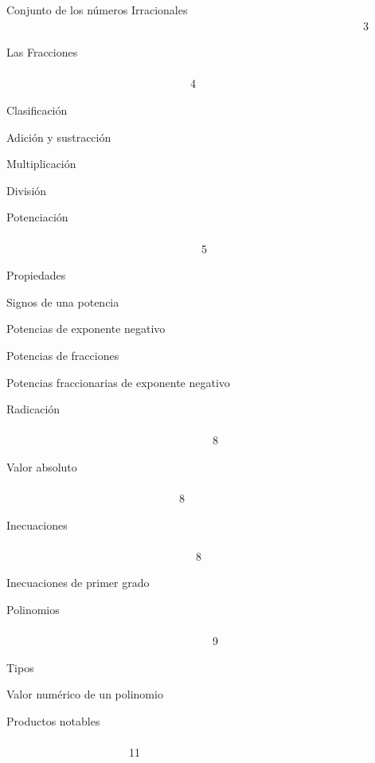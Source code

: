\documentclass{article}
\begin{document}
Conjunto de los n\'umeros Irracionales \ \ \ \ \ \ \ \ \ \ \ \ \ \ \ \ \ \ \ \ \ \ \ \ \ \ \ \ \ \ \ \ \ \ \ \ \ \ \ \ \ \ \ \ \ \ \ \ \ \ \ \ \ \ \ \ \ \ \ \ \ \ \ \ 3

Las Fracciones \ \ \ \ \ \ \ \ \ \ \ \ \ \ \ \ \ \ \ \ \ \ \ \ \ \ \ \ \ \ \ \ \ \ \ \ \ \ \ \ \ \ \ \ \ \ \ \ \ \ \ \ \ \ \ \ \ \ \ \ \ \ \ \ \ \ \ \ \ \ \ \ \ \ \ \ \ \ \ \ \ \ \ \ \ \ \ \ \ \ \ \ \ \ \ \ \ \ \ \ \ \ \ \ \ 4

Clasificaci\'on

Adici\'on y sustracci\'on

Multiplicaci\'on

Divisi\'on

Potenciaci\'on \ \ \ \ \ \ \ \ \ \ \ \ \ \ \ \ \ \ \ \ \ \ \ \ \ \ \ \ \ \ \ \ \ \ \ \ \ \ \ \ \ \ \ \ \ \ \ \ \ \ \ \ \ \ \ \ \ \ \ \ \ \ \ \ \ \ \ \ \ \ \ \ \ \ \ \ \ \ \ \ \ \ \ \ \ \ \ \ \ \ \ \ \ \ \ \ \ \ \ \ \ \ \ \ \ \ \ 5

Propiedades

Signos de una potencia

Potencias de exponente negativo

Potencias de fracciones

Potencias fraccionarias de exponente negativo

Radicaci\'on \ \ \ \ \ \ \ \ \ \ \ \ \ \ \ \ \ \ \ \ \ \ \ \ \ \ \ \ \ \ \ \ \ \ \ \ \ \ \ \ \ \ \ \ \ \ \ \ \ \ \ \ \ \ \ \ \ \ \ \ \ \ \ \ \ \ \ \ \ \ \ \ \ \ \ \ \ \ \ \ \ \ \ \ \ \ \ \ \ \ \ \ \ \ \ \ \ \ \ \ \ \ \ \ \ \ \ \ \ 8

Valor absoluto \ \ \ \ \ \ \ \ \ \ \ \ \ \ \ \ \ \ \ \ \ \ \ \ \ \ \ \ \ \ \ \ \ \ \ \ \ \ \ \ \ \ \ \ \ \ \ \ \ \ \ \ \ \ \ \ \ \ \ \ \ \ \ \ \ \ \ \ \ \ \ \ \ \ \ \ \ \ \ \ \ \ \ \ \ \ \ \ \ \ \ \ \ \ \ \ \ \ \ \ \ \ \ 8

Inecuaciones \ \ \ \ \ \ \ \ \ \ \ \ \ \ \ \ \ \ \ \ \ \ \ \ \ \ \ \ \ \ \ \ \ \ \ \ \ \ \ \ \ \ \ \ \ \ \ \ \ \ \ \ \ \ \ \ \ \ \ \ \ \ \ \ \ \ \ \ \ \ \ \ \ \ \ \ \ \ \ \ \ \ \ \ \ \ \ \ \ \ \ \ \ \ \ \ \ \ \ \ \ \ \ \  \ \ 8

Inecuaciones de primer grado

Polinomios \ \ \ \ \ \ \ \ \ \ \ \ \ \ \ \ \ \ \ \ \ \ \ \ \ \ \ \ \ \ \ \ \ \ \ \ \ \ \ \ \ \ \ \ \ \ \ \ \ \ \ \ \ \ \ \ \ \ \ \ \ \ \ \ \ \ \ \ \ \ \ \ \ \ \ \ \ \ \ \ \ \ \ \ \ \ \ \ \ \ \ \ \ \ \ \ \ \ \ \ \ \ \ \ \ \ \ \ \ 9

Tipos

Valor num\'erico de un polinomio

Productos notables \ \ \ \ \ \ \ \ \ \ \ \ \ \ \ \ \ \ \ \ \ \ \ \ \ \ \ \ \ \ \ \ \ \ \ \ \ \ \ \ \ \ \ \ \ \ \ \ \ \ \ \ \ \ \ \ \ \ \ \ \ \ \ \ \ \ \ \ \ \ \ \ \ \ \ \ \ \ \ \ \ \ \ \ \ \ \ \ \ \ \ \ \ \ 11
\end{document}
